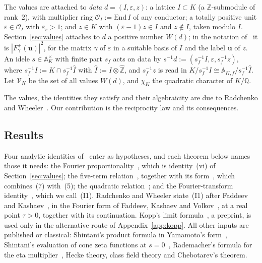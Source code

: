 \documentclass[11pt]{amsart}
\numberwithin{equation}{section}
\theoremstyle{plain}
\theoremstyle{definition}
\theoremstyle{remark}
\newcommand{\A}{\mathbb{A}}
\begin{document}
The values are attached to \emph{data} $d=(I,\varepsilon,z)$: a lattice $I\subset K$ (a $\mathbb Z$-submodule of rank~$2$), with multiplier ring $\mathcal O_I:=\mathrm{End}\,I$ of any conductor; a totally positive unit $\varepsilon\in\mathcal O_I$ with $\varepsilon_r>1$; and $z\in K$ with $(\varepsilon-1)z\in I$ and $z\notin I$, taken modulo $I$. Section~\ref{sec:values} attaches to $d$ a positive number $W(d)$; in the notation of~\cite{RW} it is $|F^+_\gamma(\mathbf u)|^2$, for the matrix $\gamma$ of $\varepsilon$ in a suitable basis of $I$ and the label $\mathbf u$ of $z$. An idele $s\in\A_K^\times$ with finite part $s_f$ acts on data by $s^{-1}d:=(s_f^{-1}I,\varepsilon,s_f^{-1}z)$, where $s_f^{-1}I:=K\cap s_f^{-1}\widehat I$ with $\widehat I:=I\otimes\widehat{\mathbb Z}$, and $s_f^{-1}z$ is read in $K/s_f^{-1}I\cong\A_{K,f}/s_f^{-1}\widehat I$. Let $\mathcal V_K$ be the set of all values $W(d)$, and $\chi_K$ the quadratic character of $K/\mathbb Q$.

The values, the identities they satisfy and their algebraicity are due to Radchenko and Wheeler~\cite{RW}. Our contribution is the reciprocity law and its consequences.

\subsection{Results}\label{sec:results}

Four analytic identities of~\cite{RW} enter as hypotheses, and each theorem below names those it needs: the Fourier proportionality~\cite[(6)]{RW}, which is identity~(vi) of Section~\ref{sec:values}; the five-term relation~\cite[(7)]{RW}, together with its form~\cite[(36)]{RW}, which combines~(7) with~(5); the quadratic relation~\cite[Thm.~7, (39)]{RW}; and the Fourier-transform identity~\cite[(15)]{RW}, which we call~(I1). Radchenko and Wheeler state~(I1) after Faddeev and Kashaev~\cite{FK94}, in the Fourier form of Faddeev, Kashaev and Volkov~\cite{FKV}, at a real point $\tau>0$, together with its continuation. Kopp's limit formula~\cite[Thm.~1.1]{Ko}, a preprint, is used only in the alternative route of Appendix~\ref{app:kopp}. All other inputs are published or classical: Shintani's product formula in Yamamoto's form~\cite{Sh, Ya08, Ya10}, Shintani's evaluation of cone zeta functions at $s=0$~\cite{Sh76}, Rademacher's formula for the eta multiplier~\cite{RG}, Hecke theory, class field theory and Chebotarev's theorem.
\end{document}
